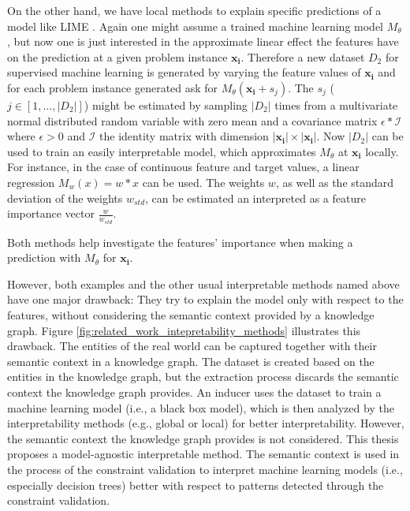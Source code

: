 On the other hand, we have local methods to explain specific predictions of a model like LIME \cite{ribeiro2016should}. Again one might assume a trained machine learning model $M_\theta$, but now one is just interested in the approximate linear effect the features have on the prediction at a given problem instance $\mathbf{x_i}$. Therefore a new dataset $D_2$ for supervised machine learning is generated by varying the feature values of $\mathbf{x_i}$ and for each problem instance generated ask for $M_\theta(\mathbf{x_i} + s_j)$. The $s_j$ ($j \in [1,...,|D_2|]$) might be estimated by sampling $|D_2|$ times from a multivariate normal distributed random variable with zero mean and a covariance matrix $\epsilon * \mathcal{I}$ where $\epsilon > 0$ and $\mathcal{I}$ the identity matrix with dimension $|\mathbf{x_i}| \times |\mathbf{x_i}|$.
Now $|D_2|$ can be used to train an easily interpretable model, which approximates $M_\theta$ at $\mathbf{x_i}$ locally. For instance, in the case of continuous feature and target values, a linear regression $M_w(x) = w * x$ can be used. The weights $w$, as well as the standard deviation of the weights $w_{std}$, can be estimated an interpreted as a feature importance vector $\frac{w}{w_{std}}$.

Both methods help investigate the features' importance when making a prediction with $M_\theta$ for $\mathbf{x_i}$.

However, both examples and the other usual interpretable methods named above have one major drawback: They try to explain the model only with respect to the features, without considering the semantic context provided by a knowledge graph. Figure \ref{fig:related_work_intepretability_methods} illustrates this drawback. The entities of the real world can be captured together with their semantic context in a knowledge graph. The dataset is created based on the entities in the knowledge graph, but the extraction process discards the semantic context the knowledge graph provides. An inducer uses the dataset to train a machine learning model (i.e., a black box model), which is then analyzed by the interpretability methods (e.g., global or local) for better interpretability. However, the semantic context the knowledge graph provides is not considered. This thesis proposes a model-agnostic interpretable method. The semantic context is used in the process of the constraint validation to interpret machine learning models (i.e., especially decision trees) better with respect to patterns detected through the constraint validation.


